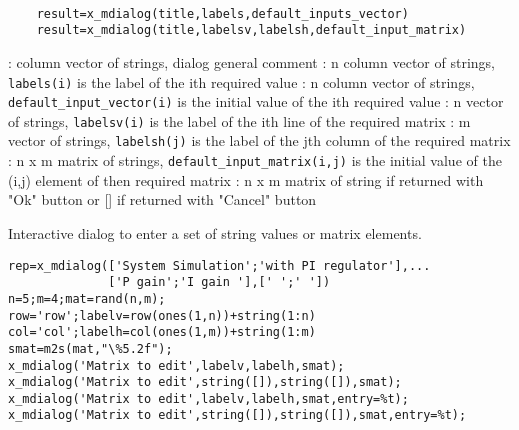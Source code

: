 
\begin{mandesc}
   \\ %
\end{mandesc}
\label{x-mdialog}
\begin{calling_sequence}
  \begin{verbatim}
    result=x_mdialog(title,labels,default_inputs_vector)   
    result=x_mdialog(title,labelsv,labelsh,default_input_matrix)   
  \end{verbatim}
\end{calling_sequence}

\begin{parameters}
  \begin{varlist}
    : column vector of strings, dialog general comment
    : n column vector of strings, \verb!labels(i)! is the label of  the ith required value
    : n  column vector of strings, \verb!default_input_vector(i)! is the initial 
    value of  the ith required value
    : n  vector of strings, \verb!labelsv(i)! is the label of  the ith line of the required matrix
    : m  vector of strings, \verb!labelsh(j)! is the label of  the jth column of the required matrix
    : n x m matrix of strings, \verb!default_input_matrix(i,j)! is the initial value of the (i,j) element of then required matrix
    : n x m matrix of string if returned with "Ok" button or [] if returned with "Cancel" button
  \end{varlist}
\end{parameters}
\begin{mandescription}
  Interactive dialog to enter a set of string values or matrix elements.
\end{mandescription}
\begin{examples}
\begin{Verbatim}
rep=x_mdialog(['System Simulation';'with PI regulator'],...
              ['P gain';'I gain '],[' ';' '])
n=5;m=4;mat=rand(n,m);
row='row';labelv=row(ones(1,n))+string(1:n)
col='col';labelh=col(ones(1,m))+string(1:m)
smat=m2s(mat,"\%5.2f");
x_mdialog('Matrix to edit',labelv,labelh,smat);
x_mdialog('Matrix to edit',string([]),string([]),smat);
x_mdialog('Matrix to edit',labelv,labelh,smat,entry=%t);
x_mdialog('Matrix to edit',string([]),string([]),smat,entry=%t);
\end{Verbatim}
\end{examples}
\begin{manseealso}
\end{manseealso}

